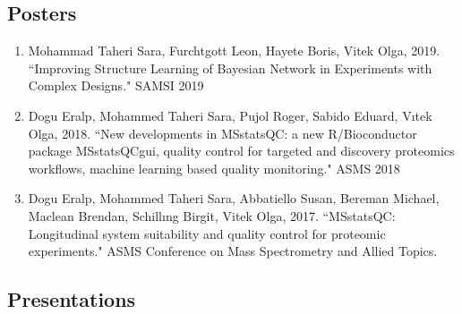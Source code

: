 \documentclass[11pt]{article}
\begin{document}
\subsection*{Posters}
\begin{enumerate}
\vspace{-0.6cm}
\item Mohammad Taheri Sara, Furchtgott Leon, Hayete Boris, Vitek Olga, 2019. ``Improving Structure Learning of Bayesian Network in Experiments with Complex Designs." SAMSI 2019

\item Dogu Eralp, Mohammed Taheri Sara, Pujol Roger, Sabido Eduard, Vıtek Olga, 2018. ``New developments in MSstatsQC: a new R/Bioconductor package MSstatsQCgui, quality control for targeted and discovery proteomics workflows, machine learning based quality monitoring." ASMS 2018

\item Dogu Eralp, Mohammed Taheri Sara, Abbatiello Susan, Bereman Michael, Maclean Brendan, Schillıng Birgit, Vitek Olga, 2017. ``MSstatsQC: Longitudinal system suitability and quality control for proteomic experiments." ASMS Conference on Mass Spectrometry and Allied Topics.

\end{enumerate}

\vspace{-0.9cm}
\subsection*{Presentations}
\end{document}
